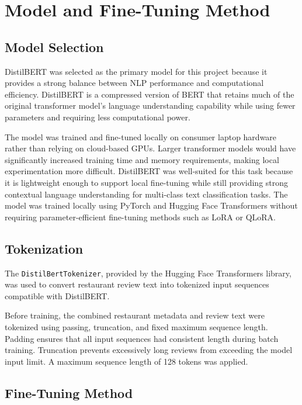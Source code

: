 \documentclass[11pt]{article}
\begin{document}
\section{Model and Fine-Tuning Method}

\subsection{Model Selection}

DistilBERT was selected as the primary model for this project because it provides a strong balance between NLP performance and computational efficiency. DistilBERT is a 
compressed version of BERT that retains much of the original transformer model's language understanding capability while using fewer parameters and requiring less 
computational power. 

The model was trained and fine-tuned locally on consumer laptop hardware rather than relying on cloud-based GPUs. Larger transformer models would have significantly 
increased training time and memory requirements, making local experimentation more difficult. DistilBERT was well-suited for this task because it is lightweight enough 
to support local fine-tuning while still providing strong contextual language understanding for multi-class text classification tasks. The model was trained 
locally using PyTorch and Hugging Face Transformers without requiring parameter-efficient fine-tuning methods such as LoRA or QLoRA.


\subsection{Tokenization}

The \texttt{DistilBertTokenizer}, provided by the Hugging Face Transformers library, was used to convert restaurant review text into tokenized input sequences 
compatible with DistilBERT. 

\medbreak \noindent Before training, the combined restaurant metadata and review text were tokenized using passing, truncation, and fixed maximum sequence length. 
Padding ensures that all input sequences had consistent length during batch training. Truncation prevents excessively long reviews from exceeding the model input limit. 
A maximum sequence length of 128 tokens was applied. 



\subsection{Fine-Tuning Method}
\end{document}
